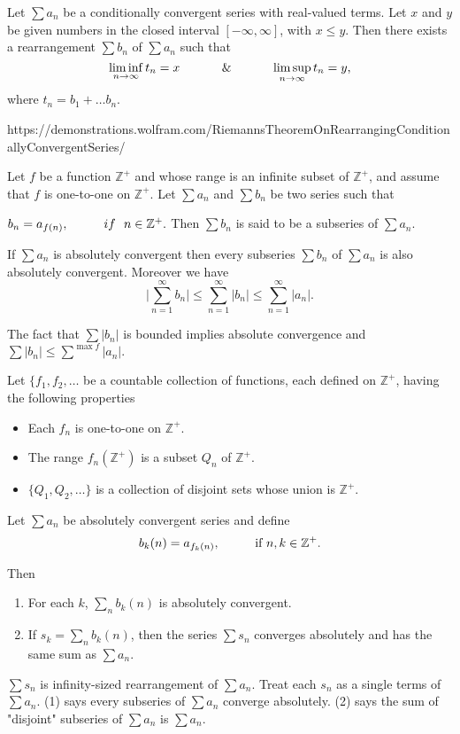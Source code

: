 \documentclass[10pt,a4paper]{book}
\begin{document}
\begin{Thm}
Let $\sum a_n$ be a conditionally convergent series with real-valued terms. Let $x$ and $y$ be given numbers in the closed interval $[-\infty , \infty]$, with $x\leq y$. Then there exists a rearrangement $\sum b_n$ of $\sum a_n$ such that
$$\liminf_{n \rightarrow \infty} t_n = x \sp \And \sp \limsup_{n \rightarrow \infty} t_n = y,$$
where $t_n = b_1 + \dots b_n$.
\end{Thm}
   \PP https://demonstrations.wolfram.com/RiemannsTheoremOnRearrangingConditionallyConvergentSeries/
\begin{deff}
Let $f$ be  a function $\mathbb{Z}^+$ and whose range is an infinite subset of $\mathbb{Z}^+$, and assume that $f$ is one-to-one on $\mathbb{Z}^+.$ Let $\sum a_n$ and $\sum b_n$ be two series such that

$b_n = a_{f(n)}, \sp if \ \ n \in \mathbb{Z}^+.$
Then $\sum b_n$ is said to be a subseries of $\sum a_n$.
\end{deff} 
\begin{Thm}
If $\sum a_n$ is absolutely convergent then every subseries $\sum b_n$ of $\sum a_n$ is also absolutely convergent. Moreover we have 
$$\bigg| \sum_{n =1}^\infty b_n \bigg |\leq  \sum_{n =1}^\infty |b_n| \leq  \sum_{n =1}^\infty |a_n|.$$
\end{Thm}
\PP The fact that $\sum |b_n|$ is bounded implies absolute convergence and $\sum |b_n| \leq \sum^{\max f}|a_n|. $
\begin{Thm}
Let $\{f_1, f_2, \dots$ be a countable collection of functions, each defined on $\mathbb{Z}^+$, having the following properties
\begin{itemize}
    \item Each $f_n$ is one-to-one on $\mathbb{Z}^+$.
    \item The range $f_n(\mathbb{Z}^+)$ is a subset $Q_n$ of $\mathbb{Z}^+$.
    \item $\{Q_1, Q_2, \dots\}$ is a collection of disjoint sets whose union is $\mathbb{Z}^+.$

 
\end{itemize}
Let $\sum a_n$ be absolutely convergent series and define
$$b_k(n) = a_{f_k(n)}, \sp \text{if } n,k \in \mathbb{Z}^+.$$

Then
\begin{enumerate}
    \item For each $k$, $\sum_n b_k(n)$ is absolutely convergent.
    \item If $s_k = \sum_n b_k(n)$, then the series $\sum s_n$ converges absolutely and has the same sum as $\sum a_n$.
\end{enumerate}
\end{Thm}
\PP $\sum s_n$ is  infinity-sized rearrangement of $\sum a_n$. Treat each $s_n$ as a single terms of $\sum a_n$. (1) says every subseries of $\sum a_n$ converge absolutely. (2) says the sum of "disjoint" subseries of $\sum a_n$ is $\sum a_n$.
\end{document}
